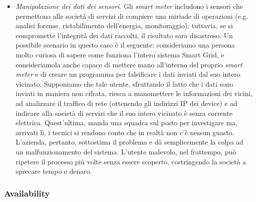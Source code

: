 \begin{itemize}
\item \textit{Manipolazione dei dati dei sensori}. Gli \textit{smart meter} includono i sensori che permettono alle società di servizi di compiere una miriade di operazioni (e.g. analisi forense, ristabilimento dell'energia, monitoraggio); tuttavia, se si compromette l'integrità dei dati raccolti, il risultato sara disastroso. Un possibile scenario in questo caso è il seguente: consideriamo una persona molto curiosa di sapere come funziona l'intero sistema Smart Grid, e consideriamola anche capace di mettere mano all'interno del proprio \textit{smart meter} e di creare un programma per falsificare i dati inviati dal suo intero vicinato. Supponiamo che tale utente, sfruttando il fatto che i dati sono inviati in maniera non cifrata, riesca a manomettere le informazioni dei vicini, ad analizzare il traffico di rete (ottenendo gli indirizzi IP dei device) e ad indicare alla società di servizi che il suo intero vicinato è senza corrente elettrica. Quest'ultima, manda una squadra sul posto per investigare ma, arrivati lì, i tecnici si rendono conto che in realtà non c'è nessun guasto. L'azienda, pertanto, sottostima il problema e dà semplicemente la colpa ad un malfunzionamento del sistema. L'utente malevolo, nel frattempo, può ripetere il processo più volte senza essere scoperto, costringendo la società a sprecare tempo e denaro.
\end{itemize}

\subsubsection{Availability}


